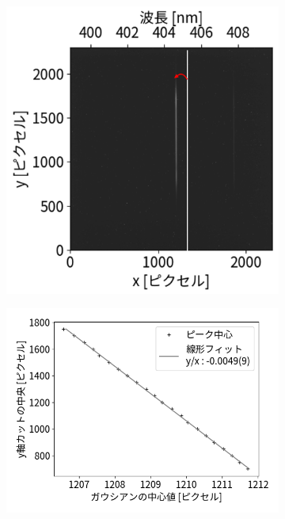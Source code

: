 \documentclass[a4paper,11pt,uplatex]{jsbook}
\begin{document}
\begin{figure}[h]
  \centering
  \begin{subfigure}[h]{0.3\linewidth}
    \centering
    \includegraphics[width=\linewidth]{image/4-tilt.png}
  \end{subfigure}
  \hfill
  \begin{subfigure}[h]{0.3\linewidth}
    \centering
    \includegraphics[width=\linewidth]{image/4-tiltfpeak.png}

\end{subfigure}
\end{figure}
\end{document}
